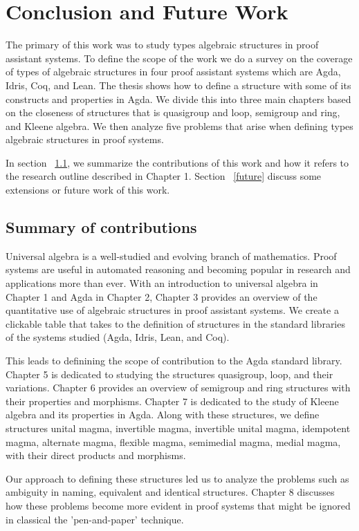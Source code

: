 \chapter{Conclusion and Future Work}
The primary of this work was to study types algebraic structures in proof
assistant systems. To define the scope of the work we do a survey on the
coverage of types of algebraic structures in four proof assistant systems which
are Agda, Idris, Coq, and Lean. The thesis shows how to define a structure with
some of its constructs and properties in Agda. We divide this into three main
chapters based on the closeness of structures that is quasigroup and loop,
semigroup and ring, and Kleene algebra. We then analyze five problems that arise
when defining types algebraic structures in proof systems.

In section ~\ref{contribution}, we summarize the contributions of this work and
how it refers to the research outline described in Chapter 1. Section
~\ref{future} discuss some extensions or future work of this work. 

\section{Summary of contributions}
\label{contribution}
Universal algebra is a well-studied and evolving branch of mathematics. Proof
systems are useful in automated reasoning and becoming popular in research and
applications more than ever. With an introduction to universal algebra in
Chapter 1 and Agda in Chapter 2, Chapter 3 provides an overview of the
quantitative use of algebraic structures in proof assistant systems. We create a
clickable table that takes to the definition of structures in the standard
libraries of the systems studied (Agda, Idris, Lean, and Coq).

This leads to definining the scope of contribution to the Agda standard library.
Chapter 5 is dedicated to studying the structures quasigroup, loop, and their
variations. Chapter 6 provides an overview of semigroup and ring structures with
their properties and morphisms. Chapter 7 is dedicated to the study of Kleene
algebra and its properties in Agda. Along with these structures, we define
structures unital magma, invertible magma, invertible unital magma, idempotent
magma, alternate magma, flexible magma, semimedial magma, medial magma, with
their direct products and morphisms.

Our approach to defining these structures led us to analyze the problems such as
ambiguity in naming, equivalent and identical structures. Chapter 8 discusses
how these problems become more evident in proof systems that might be ignored in
classical the 'pen-and-paper' technique.

